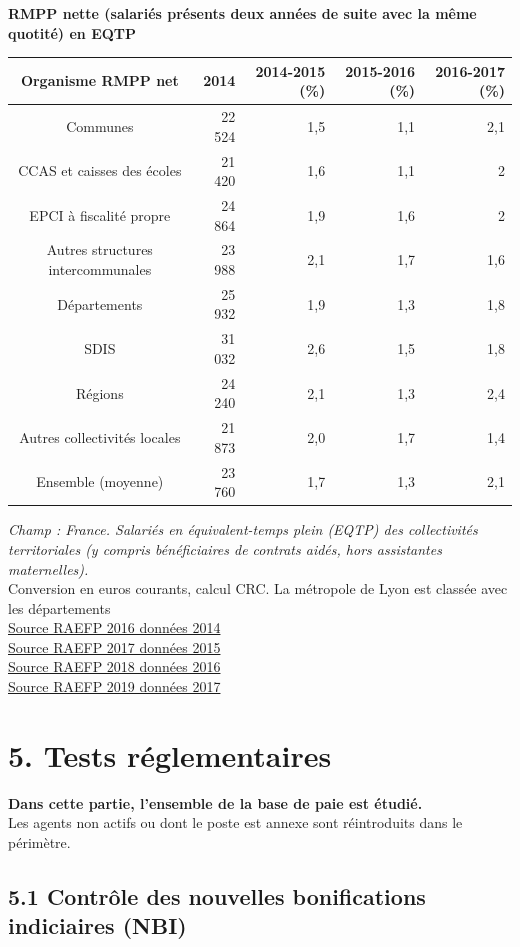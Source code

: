 \textbf{RMPP nette (salariés présents deux années de suite avec la même
quotité) en EQTP}

\begin{longtable}[]{@{}crrrr@{}}
\toprule
Organisme RMPP net & 2014 & 2014-2015 (\%) & 2015-2016 (\%) & 2016-2017
(\%)\tabularnewline
\midrule
\endhead
Communes & 22 524 & 1,5 & 1,1 & 2,1\tabularnewline
CCAS et caisses des écoles & 21 420 & 1,6 & 1,1 & 2\tabularnewline
EPCI à fiscalité propre & 24 864 & 1,9 & 1,6 & 2\tabularnewline
Autres structures intercommunales & 23 988 & 2,1 & 1,7 &
1,6\tabularnewline
Départements & 25 932 & 1,9 & 1,3 & 1,8\tabularnewline
SDIS & 31 032 & 2,6 & 1,5 & 1,8\tabularnewline
Régions & 24 240 & 2,1 & 1,3 & 2,4\tabularnewline
Autres collectivités locales & 21 873 & 2,0 & 1,7 & 1,4\tabularnewline
Ensemble (moyenne) & 23 760 & 1,7 & 1,3 & 2,1\tabularnewline
\bottomrule
\end{longtable}

\emph{Champ : France. Salariés en équivalent-temps plein (EQTP) des
collectivités territoriales (y compris bénéficiaires de contrats aidés,
hors assistantes maternelles).}\\
Conversion en euros courants, calcul CRC. La métropole de Lyon est
classée avec les départements\\
\href{../Docs/RA_2016.pdf}{Source RAEFP 2016 données 2014}\\
\href{../Docs/RA_2017.pdf}{Source RAEFP 2017 données 2015}\\
\href{../Docs/RA_2018.pdf}{Source RAEFP 2018 données 2016}\\
\href{../Docs/RA_2019.pdf}{Source RAEFP 2019 données 2017}

\newpage

\hypertarget{tests-reglementaires}{%
\section{5. Tests réglementaires}\label{tests-reglementaires}}

\textbf{Dans cette partie, l'ensemble de la base de paie est étudié.}\\
Les agents non actifs ou dont le poste est annexe sont réintroduits dans
le périmètre.

\hypertarget{controle-des-nouvelles-bonifications-indiciaires-nbi}{%
\subsection{5.1 Contrôle des nouvelles bonifications indiciaires
(NBI)}\label{controle-des-nouvelles-bonifications-indiciaires-nbi}}

